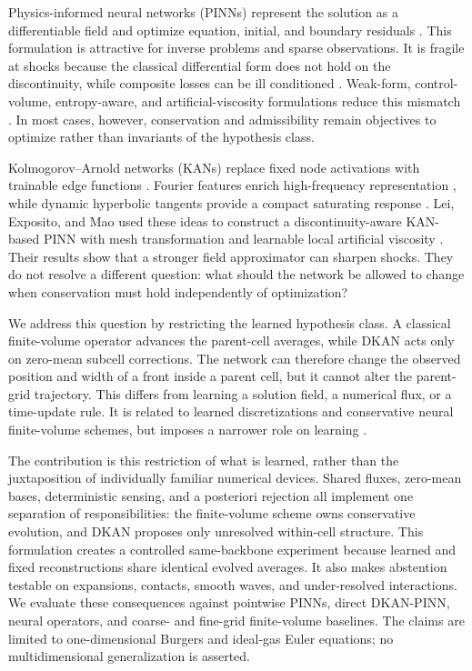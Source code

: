 \documentclass[10pt,twocolumn]{article}
\begin{document}
Physics-informed neural networks (PINNs) represent the solution as a differentiable field and optimize equation, initial, and boundary residuals \citep{raissi2019pinn}. This formulation is attractive for inverse problems and sparse observations. It is fragile at shocks because the classical differential form does not hold on the discontinuity, while composite losses can be ill conditioned \citep{wang2021gradient,krishnapriyan2021failure}. Weak-form, control-volume, entropy-aware, and artificial-viscosity formulations reduce this mismatch \citep{patel2022thermodynamic,coutinho2023avpinn,deryck2024wpinn}. In most cases, however, conservation and admissibility remain objectives to optimize rather than invariants of the hypothesis class.

Kolmogorov--Arnold networks (KANs) replace fixed node activations with trainable edge functions \citep{liu2024kan}. Fourier features enrich high-frequency representation \citep{zhang2025kaf}, while dynamic hyperbolic tangents provide a compact saturating response \citep{zhu2025dyt}. Lei, Exposito, and Mao used these ideas to construct a discontinuity-aware KAN-based PINN with mesh transformation and learnable local artificial viscosity \citep{lei2026dkanpinn}. Their results show that a stronger field approximator can sharpen shocks. They do not resolve a different question: what should the network be allowed to change when conservation must hold independently of optimization?

We address this question by restricting the learned hypothesis class. A classical finite-volume operator advances the parent-cell averages, while DKAN acts only on zero-mean subcell corrections. The network can therefore change the observed position and width of a front inside a parent cell, but it cannot alter the parent-grid trajectory. This differs from learning a solution field, a numerical flux, or a time-update rule. It is related to learned discretizations and conservative neural finite-volume schemes, but imposes a narrower role on learning \citep{barsinai2019discretization,kochkov2021cfd,lichtle2025unfv,cassia2024godunovloss,huang2025tvd}.

The contribution is this restriction of what is learned, rather than the juxtaposition of individually familiar numerical devices. Shared fluxes, zero-mean bases, deterministic sensing, and a posteriori rejection all implement one separation of responsibilities: the finite-volume scheme owns conservative evolution, and DKAN proposes only unresolved within-cell structure. This formulation creates a controlled same-backbone experiment because learned and fixed reconstructions share identical evolved averages. It also makes abstention testable on expansions, contacts, smooth waves, and under-resolved interactions. We evaluate these consequences against pointwise PINNs, direct DKAN-PINN, neural operators, and coarse- and fine-grid finite-volume baselines. The claims are limited to one-dimensional Burgers and ideal-gas Euler equations; no multidimensional generalization is asserted.
\end{document}
